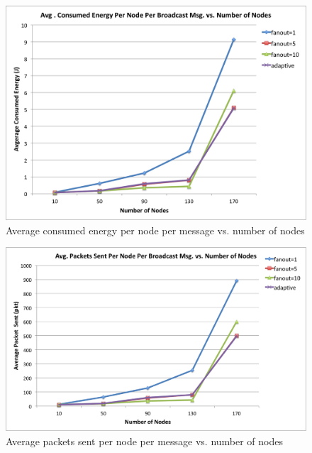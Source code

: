 \begin{figure}
	\centering
	\includegraphics[width=5.5in]{energy.png}
	\caption{Average consumed energy per node per message vs. number of nodes}
	\label{fig:energy}
\end{figure}

\begin{figure}
	\centering
	\includegraphics[width=5.5in]{overhead.png}
	\caption{Average packets sent per node per message vs. number of nodes}
	\label{fig:overhead}
\end{figure}

